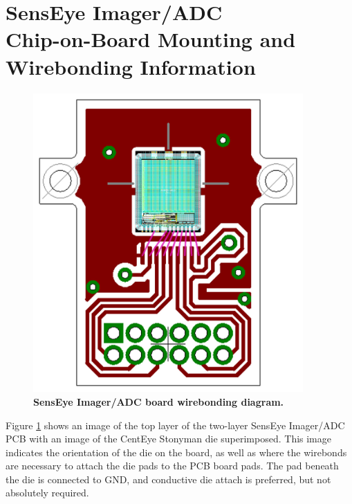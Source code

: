 \documentclass[12pt,letterpaper]{report}
\begin{document}
\section*{SensEye Imager/ADC\\Chip-on-Board Mounting and Wirebonding Information}
\begin{figure}[h!]
 \centering
 \includegraphics[width=0.92\textwidth]{senseye-imager-adc-wirebonding-diagram.png}
 \caption[b]{\textbf{SensEye Imager/ADC board wirebonding diagram.}}
 \label{fig-wirebonding}
\end{figure}

\noindent
Figure \ref{fig-wirebonding} shows an image of the top layer of the two-layer
SensEye Imager/ADC PCB with an image of the CentEye Stonyman die superimposed.
This image indicates the orientation of the die on the board, as well as where
the wirebonds are necessary to attach the die pads to the PCB board pads.  The
pad beneath the die is connected to GND, and conductive die attach is preferred,
but not absolutely required.\\
\end{document}
